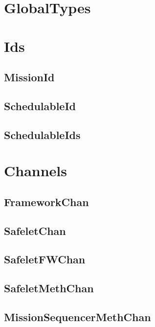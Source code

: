 \documentclass{article}
\begin{document}
\section{GlobalTypes}


\section{Ids}
\subsection{MissionId}


\subsection{SchedulableId}

\newpage
\subsection{SchedulableIds}

\newpage

\section{Channels}
\subsection{FrameworkChan}


\subsection{SafeletChan}


\subsection{SafeletFWChan}


\subsection{SafeletMethChan}


\subsection{MissionSequencerMethChan}

\end{document}
